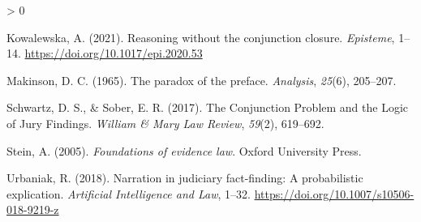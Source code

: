 \documentclass[
  10pt,
  dvipsnames,enabledeprecatedfontcommands]{scrartcl}
\newlength{\cslhangindent}
\newenvironment{CSLReferences}[2] %
 {%
  \setlength{\parindent}{0pt}
  \ifodd #1 \everypar{\setlength{\hangindent}{\cslhangindent}}\ignorespaces\fi
  \ifnum #2 > 0
  \setlength{\parskip}{#2\baselineskip}
  \fi
 }%
 {}
\begin{document}
\begin{CSLReferences}{1}{0}
\leavevmode\hypertarget{ref-Kowalewska2021conjunction}{}%
Kowalewska, A. (2021). Reasoning without the conjunction closure.
\emph{Episteme}, 1--14. \url{https://doi.org/10.1017/epi.2020.53}

\leavevmode\hypertarget{ref-Makinson1965-MAKTPO-2}{}%
Makinson, D. C. (1965). The paradox of the preface. \emph{Analysis},
\emph{25}(6), 205--207.

\leavevmode\hypertarget{ref-schwartz2017ConjunctionProblemLogic}{}%
Schwartz, D. S., \& Sober, E. R. (2017). The {Conjunction Problem} and
the {Logic} of {Jury Findings}. \emph{William \& Mary Law Review},
\emph{59}(2), 619--692.

\leavevmode\hypertarget{ref-Stein05}{}%
Stein, A. (2005). \emph{Foundations of evidence law}. Oxford University
Press.

\leavevmode\hypertarget{ref-urbaniak2018narration}{}%
Urbaniak, R. (2018). Narration in judiciary fact-finding: A
probabilistic explication. \emph{Artificial Intelligence and Law},
1--32. \url{https://doi.org/10.1007/s10506-018-9219-z}

\end{CSLReferences}
\end{document}
